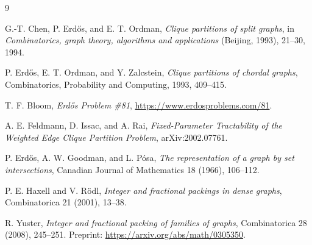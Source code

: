 \documentclass[11pt]{article}
\begin{document}
\begin{thebibliography}{9}

G.-T. Chen, P. Erdős, and E. T. Ordman,
\emph{Clique partitions of split graphs},
in \emph{Combinatorics, graph theory, algorithms and applications} (Beijing, 1993), 21--30, 1994.

P. Erdős, E. T. Ordman, and Y. Zalcstein,
\emph{Clique partitions of chordal graphs},
Combinatorics, Probability and Computing, 1993, 409--415.

T. F. Bloom,
\emph{Erdős Problem \#81},
\url{https://www.erdosproblems.com/81}.

A. E. Feldmann, D. Issac, and A. Rai,
\emph{Fixed-Parameter Tractability of the Weighted Edge Clique Partition Problem},
arXiv:2002.07761.

P. Erdős, A. W. Goodman, and L. Pósa,
\emph{The representation of a graph by set intersections},
Canadian Journal of Mathematics 18 (1966), 106--112.

P. E. Haxell and V. Rödl,
\emph{Integer and fractional packings in dense graphs},
Combinatorica 21 (2001), 13--38.

R. Yuster,
\emph{Integer and fractional packing of families of graphs},
Combinatorica 28 (2008), 245--251.
Preprint: \url{https://arxiv.org/abs/math/0305350}.

\end{thebibliography}
\end{document}
